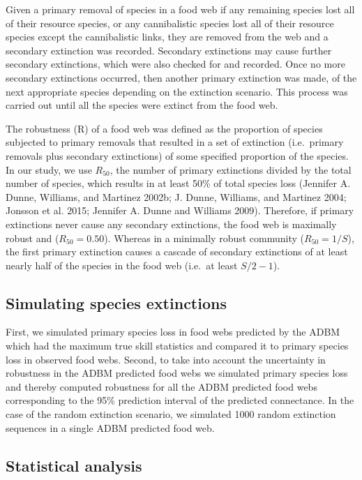 \documentclass{article}
\begin{document}
Given a primary removal of species in a food web if any remaining
species lost all of their resource species, or any cannibalistic species
lost all of their resource species except the cannibalistic links, they
are removed from the web and a secondary extinction was recorded.
Secondary extinctions may cause further secondary extinctions, which
were also checked for and recorded. Once no more secondary extinctions
occurred, then another primary extinction was made, of the next
appropriate species depending on the extinction scenario. This process
was carried out until all the species were extinct from the food web.

The robustness (R) of a food web was defined as the proportion of
species subjected to primary removals that resulted in a set of
extinction (i.e.~primary removals plus secondary extinctions) of some
specified proportion of the species. In our study, we use \(R_{50}\),
the number of primary extinctions divided by the total number of
species, which results in at least 50\% of total species loss (Jennifer
A. Dunne, Williams, and Martinez 2002b; J. Dunne, Williams, and Martinez
2004; Jonsson et al. 2015; Jennifer A. Dunne and Williams 2009).
Therefore, if primary extinctions never cause any secondary extinctions,
the food web is maximally robust and (\(R_{50} = 0.50\)). Whereas in a
minimally robust community (\(R_{50} = 1/S\)), the first primary
extinction causes a cascade of secondary extinctions of at least nearly
half of the species in the food web (i.e.~at least \(S/2 - 1\)).

\hypertarget{simulating-species-extinctions}{%
\subsection{Simulating species
extinctions}\label{simulating-species-extinctions}}

First, we simulated primary species loss in food webs predicted by the
ADBM which had the maximum true skill statistics and compared it to
primary species loss in observed food webs. Second, to take into account
the uncertainty in robustness in the ADBM predicted food webs we
simulated primary species loss and thereby computed robustness for all
the ADBM predicted food webs corresponding to the 95\% prediction
interval of the predicted connectance. In the case of the random
extinction scenario, we simulated 1000 random extinction sequences in a
single ADBM predicted food web.

\hypertarget{statistical-analysis}{%
\subsection{Statistical analysis}\label{statistical-analysis}}
\end{document}
